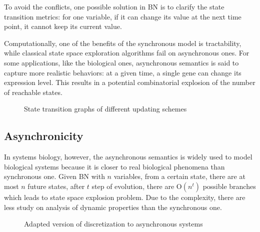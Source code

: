 To avoid the conflicts, one possible solution in BN is to clarify the state transition metrics:
for one variable, if it can change its value at the next time point, it cannot keep its current value.

Computationally, one of the benefits of the synchronous model is tractability, while classical state space exploration algorithms fail on asynchronous ones.
For some applications, like the biological ones, asynchronous semantics is said to capture more realistic behaviors: at a given time, a single gene can change its expression level.
This results in a potential combinatorial explosion of the number of reachable states.

\begin{figure}[ht]
\caption[Update schemes]{State transition graphs of different updating schemes}
\end{figure}
\subsection{Asynchronicity}
In systems biology, however, the asynchronous semantics is widely used to model biological systems because it is closer to real biological phenomena than synchronous one.
Given BN with $n$ variables, from a certain state, there are at most $n$ future states, after $t$ step of evolution, there are O$(n^t)$ possible branches which leads to state space explosion problem.
Due to the complexity, there are less study on analysis of dynamic properties than the synchronous one.
\begin{figure}
    \centering
    
    \caption[Discretization]{Adapted version of discretization to asynchronous systems}
    \label{fig:my_label}
\end{figure}

